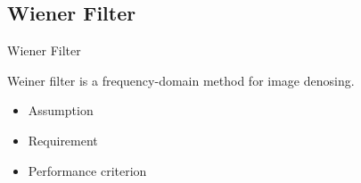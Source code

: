 \documentclass{beamer}
\begin{document}
\subsection{Wiener Filter}
\begin{frame}{Wiener Filter}

Weiner filter is a frequency-domain method for image denosing. %
%
\vspace{1cm}
\begin{itemize}
	\item Assumption %
	\item Requirement %
	\item Performance criterion %
\end{itemize}



\end{frame}



	
	
	
	
\end{document}
